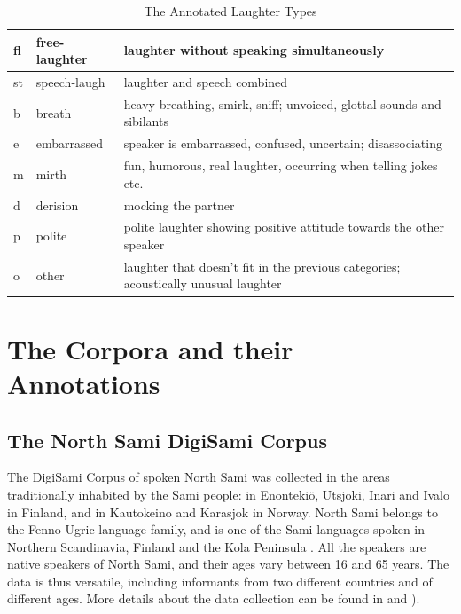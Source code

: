 \documentclass[10pt,journal,compsoc]{IEEEtran}
\begin{document}
\begin{table}[!t]
\caption{The Annotated Laughter Types}
\label{tab:laughter-types}
\centering
\begin{tabular}{| p{0.2cm} | p{1.7cm} | p{12cm} |}
\hline
fl	& free-laughter	& laughter without speaking simultaneously \\ \hline
st	& speech-laugh	& laughter and speech combined \\ \hline
b	& breath	    & heavy breathing, smirk, sniff; unvoiced, glottal sounds and sibilants \\ \hline
e	& embarrassed	& speaker is embarrassed, confused, uncertain; disassociating  \\ \hline
m	& mirth	        & fun, humorous, real laughter, occurring when telling jokes etc. \\ \hline
d	& derision	    & mocking the partner \\ \hline
p	& polite	    & polite laughter showing positive attitude towards the other speaker \\ \hline
o	& other    	    & laughter that doesn't fit in the previous categories; acoustically unusual laughter\\ \hline
\end{tabular}
\end{table}

\section{The Corpora and their Annotations}
\label{sec:corpora-annotations}

\subsection{The North Sami DigiSami Corpus}
\label{sec:digisami-corpus}

The DigiSami Corpus of spoken North Sami was collected in the areas traditionally inhabited by the Sami people: in Enonteki\"{o}, Utsjoki, Inari and Ivalo in Finland, and in Kautokeino and Karasjok in Norway.
North Sami belongs to the Fenno-Ugric language family, and is one of the Sami languages
spoken in Northern Scandinavia, Finland and the Kola Peninsula \cite{Hirvonen:ea:97}.
All the speakers are native speakers of North Sami, and their ages vary between 16 and 65 years.
The data is thus versatile, including informants from two different countries and of different ages.
More details about the data collection can be found in \cite{Jokinen:Wilcock:SLTU:14} and \cite{Jokinen:LREC:14}).
\end{document}
